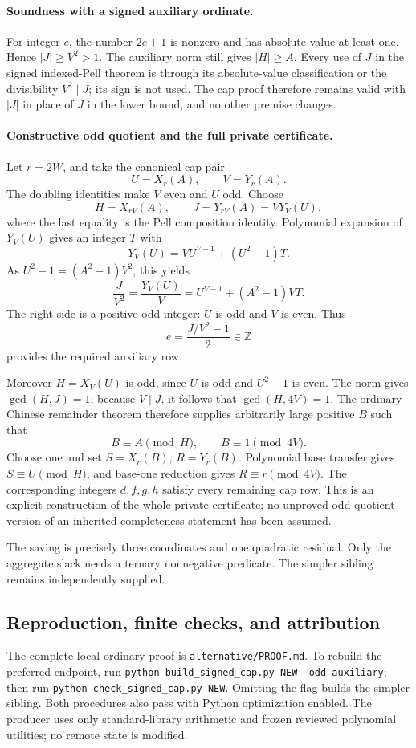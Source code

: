 \paragraph{Soundness with a signed auxiliary ordinate.}
For integer $e$, the number $2e+1$ is nonzero and has absolute
value at least one. Hence $|J|\geq V^2>1$. The auxiliary norm
still gives $|H|\geq A$. Every use of $J$ in the signed
indexed-Pell theorem is through its absolute-value classification
or the divisibility $V^2\mid J$; its sign is not used. The
cap proof therefore remains valid with $|J|$ in place of $J$
in the lower bound, and no other premise changes.

\paragraph{Constructive odd quotient and the full private certificate.}
Let $r=2W$, and take the canonical cap pair
\[
 U=X_r(A),\qquad V=Y_r(A).
\]
The doubling identities make $V$ even and $U$ odd. Choose
\[
 H=X_{rV}(A),\qquad J=Y_{rV}(A)=VY_V(U),
\]
where the last equality is the Pell composition identity.
Polynomial expansion of $Y_V(U)$ gives an integer $T$ with
\[
 Y_V(U)=V U^{V-1}+(U^2-1)T.
\]
As $U^2-1=(A^2-1)V^2$, this yields
\[
 \frac{J}{V^2}=\frac{Y_V(U)}{V}
   =U^{V-1}+(A^2-1)VT.
\]
The right side is a positive odd integer: $U$ is odd and $V$
is even. Thus
\[
 e=\frac{J/V^2-1}{2}\in\mathbb Z
\]
provides the required auxiliary row.

Moreover $H=X_V(U)$ is odd, since $U$ is odd and $U^2-1$ is
even. The norm gives $\gcd(H,J)=1$; because $V\mid J$, it
follows that $\gcd(H,4V)=1$. The ordinary Chinese remainder
theorem therefore supplies arbitrarily large positive $B$ such
that
\[
 B\equiv A\pmod H,\qquad B\equiv1\pmod{4V}.
\]
Choose one and set $S=X_r(B)$, $R=Y_r(B)$. Polynomial
base transfer gives $S\equiv U\pmod H$, and base-one
reduction gives $R\equiv r\pmod{4V}$. The corresponding
integers $d,f,g,h$ satisfy every remaining cap row. This is an
explicit construction of the whole private certificate; no
unproved odd-quotient version of an inherited completeness
statement has been assumed.

The saving is precisely three coordinates and one quadratic
residual. Only the aggregate slack needs a ternary nonnegative
predicate. The simpler sibling remains independently supplied.

\subsection{Reproduction, finite checks, and attribution}
The complete local ordinary proof is
\texttt{alternative/PROOF.md}. To rebuild the preferred endpoint,
run \texttt{python build\_signed\_cap.py NEW --odd-auxiliary};
then run \texttt{python check\_signed\_cap.py NEW}.
Omitting the flag builds the simpler sibling. Both procedures
also pass with Python optimization enabled. The producer uses
only standard-library arithmetic and frozen reviewed polynomial
utilities; no remote state is modified.


